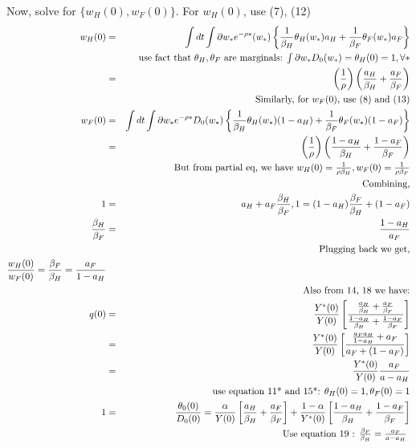 \documentclass[]{article}
\begin{document}
Now, solve for $\{w_H(0), w_F(0)\}$. For $w_H(0)$, use (7), (12)
\begin{eqnarray}
w_H(0) &=& \int dt \int \partial w_* e^{-\rho *}(w_*) \left\{\frac{1}{\beta_H} \theta_H(w_*)a_H + \frac{1}{\beta_F} \theta_F(w_*)a_F\right\}\notag\\
&&\mbox{use fact that $\theta_H, \theta_F$ are marginals: $\int \partial w_* D_0(w_*) = \theta_H(0)=1, \forall *$}\notag\\
&=& \left(\frac{1}{\rho}\right)\left(\frac{a_H}{\beta_H}+\frac{a_F}{\beta_F}\right)\\
&& \mbox{Similarly, for $w_F(0)$, use (8) and (13)}\notag\\
w_F(0) &=& \int dt \int \partial w_* e^{-\rho *} D_0 (w_*) \left\{\frac{1}{\beta_H} \theta_H(w_*)(1-a_H) + \frac{1}{\beta_F} \theta_F(w_*)(1-a_F)\right\}\notag\\
&=& \left(\frac{1}{\rho}\right)\left(\frac{1-a_H}{\beta_H}+\frac{1-a_F}{\beta_F}\right)\\
&& \mbox{But from partial eq, we have $w_H(0)=\frac{1}{\rho \beta_H}, w_F(0)=\frac{1}{\rho \beta_F}$}\notag\\
&& \mbox{Combining,}\notag\\
1&=& a_H +a_F\frac{\beta_H}{\beta_F}, 1=(1-a_H)\frac{\beta_F}{\beta_H} + (1-a_F)\notag\\
\frac{\beta_H}{\beta_F} &=& \frac{1-a_H}{a_F}\\
&&\mbox{Plugging back we get,}\notag\\
\frac{w_H(0)}{w_F(0)} = \frac{\beta_F}{\beta_H} = \frac{a_F}{1-a_H}\\
&&\mbox{Also from 14, 18 we have:}\notag\\
q(0) &=& \frac{Y^*(0)}{Y(0)} \left[\frac{\frac{a_H}{\beta_H}+\frac{a_F}{\beta_F}}{\frac{1-a_H}{\beta_H}+\frac{1-a_F}{\beta_F}}\right]\notag\\
&=& \frac{Y^*(0)}{Y(0)} \left[\frac{\frac{a_Fa_H}{1-a_H}+a_F}{a_F+(1-a_F)}\right]\notag\\
&=& \frac{Y^*(0)}{Y(0)} \frac{a_F}{a-a_H}\\
&& \mbox{use equation 11* and 15*: $\theta_H(0)=1,\theta_F(0)=1$}\notag\\
1&=& \frac{\theta_0(0)}{D_0(0)} = \frac{\alpha}{Y(0)} \left[\frac{a_H}{\beta_H} + \frac{a_F}{\beta_F}\right] + \frac{1-\alpha}{Y^*(0)} \left[\frac{1-a_H}{\beta_H}+\frac{1-a_F}{\beta_F}\right]\notag\\
&&\mbox{Use equation 19 : $\frac{\beta_F}{\beta_H} = \frac{a_F}{a-a_H}$ }\notag\\

\end{eqnarray}
\end{document}
